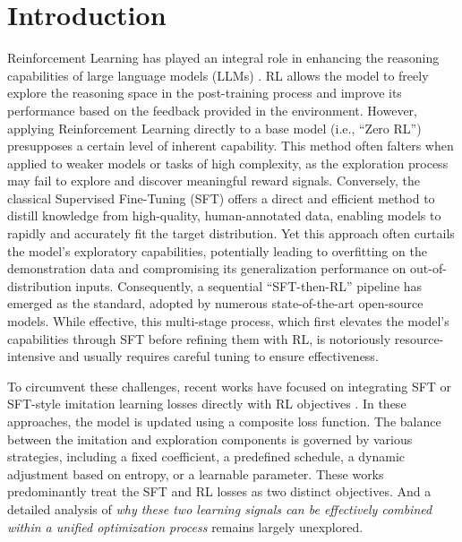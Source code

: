 \documentclass{article} %
\newcommand{\0}{\mathbb{0}}
\newcommand{\1}{\mathbb{1}}
\begin{document}
\vspace{-4mm}
\setlength{\epigraphwidth}{0.85\textwidth}
\noindent\hfill




\newpage
{
  \tableofcontents
}
\newpage



\section{Introduction}




Reinforcement Learning has played an integral role in enhancing the reasoning capabilities of large language models (LLMs) \citep{jaech2024openai, team2025kimi, guo2025deepseek}.
RL allows the model to freely explore the reasoning space in the post-training process and improve its performance based on the feedback provided in the environment. 
However, applying Reinforcement Learning directly to a base model (i.e., ``Zero RL'') \citep{zeng2025simplerlzooinvestigatingtamingzero} presupposes a certain level of inherent capability. This method often falters when applied to weaker models or tasks of high complexity, as the exploration process may fail to explore and discover meaningful reward signals. 
Conversely, the classical Supervised Fine-Tuning (SFT) \citep{wei2021finetuned} offers a direct and efficient method to distill knowledge from high-quality, human-annotated data, enabling models to rapidly and accurately fit the target distribution. Yet this approach often curtails the model's exploratory capabilities, potentially leading to overfitting on the demonstration data and compromising its generalization performance on out-of-distribution inputs. 
Consequently, a sequential ``SFT-then-RL'' pipeline \citep{yoshihara2025practical} has emerged as the standard, adopted by numerous state-of-the-art open-source models. While effective, this multi-stage process, which first elevates the model's capabilities through SFT before refining them with RL, is notoriously resource-intensive and usually requires careful tuning to ensure effectiveness.


To circumvent these challenges, recent works have focused on integrating SFT or SFT-style imitation learning losses directly with RL objectives \citep{yan2025learning, fu2025srft, zhang2025on}.
In these approaches, the model is updated using a composite loss function. The balance between the imitation and exploration components is governed by various strategies, including a fixed coefficient, a predefined schedule, a dynamic adjustment based on entropy, or a learnable parameter. 
These works predominantly treat the SFT and RL losses as two distinct objectives. And a detailed analysis of \textit{why these two learning signals can be effectively combined within a unified optimization process} remains largely unexplored.
\end{document}
